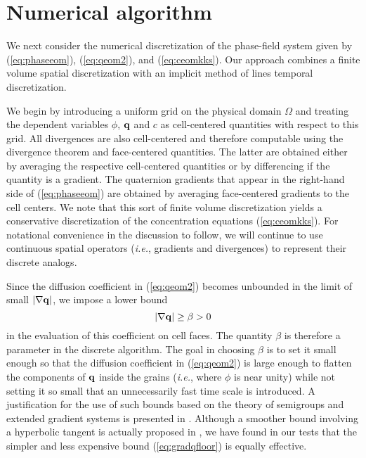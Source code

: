 \chapter{Numerical algorithm}
\label{sec:algorithm}

We next consider the numerical discretization of the phase-field
system given by (\ref{eq:phaseeom}), (\ref{eq:qeom2}), and
(\ref{eq:ceomkks}).  Our approach combines a finite volume spatial
discretization with an implicit method of lines temporal
discretization.

We begin by introducing a uniform grid on the physical domain $\Omega$
and treating the dependent variables $\phi$, ${\bf q}$ and $c$ as
cell-centered quantities with respect to this grid.  All divergences
are also cell-centered and therefore computable using the divergence
theorem and face-centered quantities.  The latter are obtained either
by averaging the respective cell-centered quantities or by
differencing if the quantity is a gradient.  The quaternion gradients
that appear in the right-hand side of (\ref{eq:phaseeom}) are obtained
by averaging face-centered gradients to the cell centers.  We note
that this sort of finite volume discretization yields a conservative
discretization of the concentration equations (\ref{eq:ceomkks}).  For
notational convenience in the discussion to follow, we will continue
to use continuous spatial operators ({\em i.e.}, gradients and
divergences) to represent their discrete analogs.

Since the diffusion coefficient in (\ref{eq:qeom2}) becomes unbounded in
the limit of small $|\nabla {\bf q}|$, we impose a lower bound
%
\begin{equation}
  |\nabla {\bf q}| \ge \beta > 0
\label{eq:gradqfloor}
\end{equation}
%
in the evaluation of this coefficient on cell faces.  The quantity
$\beta$ is therefore a parameter in the discrete algorithm.  The goal
in choosing $\beta$ is to set it small enough so that the diffusion
coefficient in (\ref{eq:qeom2}) is large enough to flatten the components
of ${\bf q}$ inside the grains ({\em i.e.}, where $\phi$ is near unity) while
not setting it so small that an unnecessarily fast time scale is
introduced.  A justification for the use of such bounds based on the
theory of semigroups and extended gradient systems is presented in
\cite{KoGi99}.  Although a smoother bound involving a hyperbolic
tangent is actually proposed in \cite{KoGi99}, we have found in our
tests that the simpler and less expensive bound (\ref{eq:gradqfloor}) is
equally effective.

